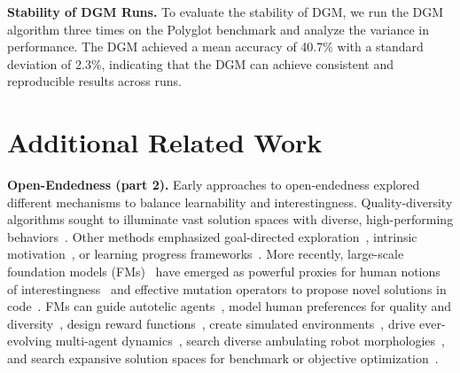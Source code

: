 \documentclass{article} %
\begin{document}
\textbf{Stability of DGM Runs.}
To evaluate the stability of DGM, we run the DGM algorithm three times on the Polyglot benchmark and analyze the variance in performance. The DGM achieved a mean accuracy of 40.7\% with a standard deviation of 2.3\%, indicating that the DGM can achieve consistent and reproducible results across runs.


\section{Additional Related Work}
\label{app:related}

\textbf{Open-Endedness (part 2).}
Early approaches to open-endedness explored different mechanisms to balance learnability and interestingness. Quality-diversity algorithms sought to illuminate vast solution spaces with diverse, high-performing behaviors~\citep{pugh2016quality, chatzilygeroudis2021quality, mouret2015illuminating, nguyen2015innovation}. Other methods emphasized goal-directed exploration~\citep{ecoffet2019go, ecoffet2021first, schaul2015universal, andrychowicz2017hindsight, eysenbach2018diversity}, intrinsic motivation~\citep{lehman2011novelty, oudeyer2007intrinsic, li2014encouraging, pathak2017curiosity}, or learning progress frameworks~\citep{kanitscheider2021multi, gaven2025magellan, baranes2013active, colas2019curious, colas2022autotelic, jiang2021prioritized, dennis2020emergent, schmidhuber2008driven, schmidhuber2013powerplay, kompella2017continual}. More recently, large-scale foundation models (FMs)~\citep{brown2020language, radford2019language} have emerged as powerful proxies for human notions of interestingness~\citep{zhang2024omni,faldor2025omni,sancaktar2025sensei} and effective mutation operators to propose novel solutions in code~\citep{romera2024mathematical,Novikov2025AlphaEvolve,lehman2023evolution,faldor2025omni,hu2025automated}. FMs can guide autotelic agents~\citep{colas2022autotelic, colas2023augmenting, colas2022language}, model human preferences for quality and diversity~\citep{bradley2023quality, ding2023quality, wang2023diversity, klissarov2023motif, klissarov2024maestromotif, samvelyan2024rainbow, lim2024large, havrilla2024surveying}, design reward functions~\citep{wiering1997hq, wang2023voyager, ma2023eureka, faldor2025omni}, create simulated environments~\citep{sudhakaran2023mariogpt, nasir2023practical, aki2024llm, nasir2024word2world, bruce2024genie, parkerholder2024genie2, schmidhuber2013powerplay}, drive ever-evolving multi-agent dynamics~\citep{dharna2024quality, zhou2025autoredteamer}, search diverse ambulating robot morphologies~\citep{lehman2023evolution}, and search expansive solution spaces for benchmark or objective optimization~\citep{lange2024large, zhang2024omni, faldor2025omni, hu2025automated, lu2024intelligent, romera2024mathematical, fernandopromptbreeder, lu2024ai, khan2024debating, lu2025automated, liu2024evolution, Novikov2025AlphaEvolve}.
\end{document}
